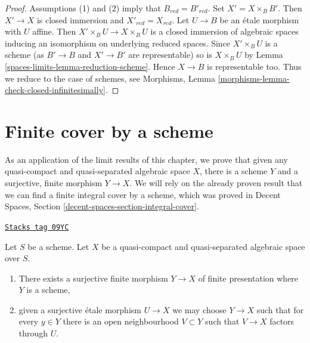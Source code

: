 \begin{proof}
Assumptions (1) and (2) imply that $B_{red} = B'_{red}$.
Set $X' = X \times_B B'$. Then $X' \to X$ is closed immersion
and $X'_{red} = X_{red}$. Let $U \to B$ be an \'etale morphism
with $U$ affine. Then $X' \times_B U \to X \times_B U$ is a
closed immersion of algebraic spaces inducing an isomorphism
on underlying reduced spaces. Since $X' \times_B U$ is a scheme
(as $B' \to B$ and $X' \to B'$ are representable) so is
$X \times_B U$ by Lemma \ref{spaces-limits-lemma-reduction-scheme}.
Hence $X \to B$ is representable too. Thus we reduce to the
case of schemes, see
Morphisms, Lemma \ref{morphisms-lemma-check-closed-infinitesimally}.
\end{proof}

\section{Finite cover by a scheme}
\label{spaces-limits-section-finite-cover}
As an application of the limit results of this chapter, we prove that given
any quasi-compact and quasi-separated algebraic space $X$, there is a scheme
$Y$ and a surjective, finite morphism $Y \to X$. We will rely on the already
proven result that we can find a finite integral cover by a scheme, which
was proved in
Decent Spaces, Section \ref{decent-spaces-section-integral-cover}.

\begin{proposition}
\label{spaces-limits-proposition-there-is-a-scheme-finite-over}
\href{https://stacks.math.columbia.edu/tag/09YC}{\texttt{Stacks tag 09YC}}

Let $S$ be a scheme. Let $X$ be a quasi-compact and quasi-separated
algebraic space over $S$.
\begin{enumerate}
\item There exists a surjective finite morphism $Y \to X$
of finite presentation where $Y$ is a scheme,
\item given a surjective \'etale morphism $U \to X$ we may choose
$Y \to X$ such that for every $y \in Y$ there is an open neighbourhood
$V \subset Y$ such that $V \to X$ factors through $U$.
\end{enumerate}
\end{proposition}

